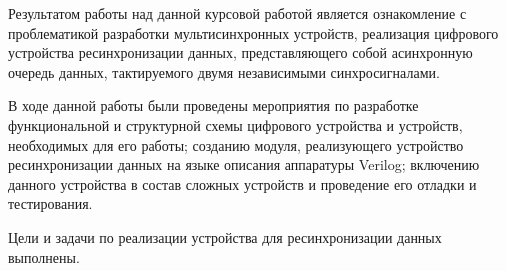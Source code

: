 \Conclusion %

Результатом работы над данной курсовой работой является ознакомление с проблематикой разработки мультисинхронных устройств, реализация цифрового устройства ресинхронизации данных, представляющего собой асинхронную очередь данных, тактируемого двумя независимыми синхросигналами.

В ходе данной работы были проведены мероприятия по разработке функциональной и структурной схемы цифрового устройства и устройств, необходимых для его работы; созданию модуля, реализующего устройство ресинхронизации данных на языке описания аппаратуры Verilog; включению данного устройства в состав сложных устройств и проведение его отладки и тестирования.

Цели и задачи по реализации устройства для ресинхронизации данных выполнены. 

